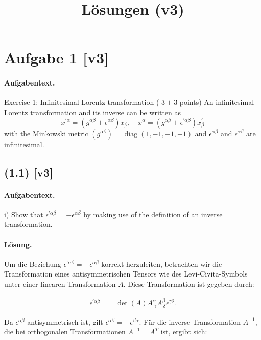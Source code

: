 \documentclass[11pt,a4paper]{article}
\title{Lösungen (v3)}
\date{}
\begin{document}
\maketitle

\section*{Aufgabe 1 [v3]}
\paragraph{Aufgabentext.}
Exercise 1: Infinitesimal Lorentz transformation ( $3+3$ points)
An infinitesimal Lorentz transformation and its inverse can be written as
$$
x^{\prime \alpha}=\left(g^{\alpha \beta}+\epsilon^{\alpha \beta}\right) x_\beta, \quad x^\alpha=\left(g^{\alpha \beta}+\epsilon^{\prime \alpha \beta}\right) x_\beta^{\prime}
$$
with the Minkowski metric $\left(g^{\alpha \beta}\right)=\operatorname{diag}(1,-1,-1,-1)$ and $\epsilon^{\alpha \beta}$ and $\epsilon^{\alpha \beta}$ are infinitesimal.

\subsection*{(1.1) [v3]}
\paragraph{Aufgabentext.}
i) Show that $\epsilon^{\prime \alpha \beta}=-\epsilon^{\alpha \beta}$ by making use of the definition of an inverse transformation.

\paragraph{Lösung.}
Um die Beziehung $\epsilon^{\prime \alpha \beta} = -\epsilon^{\alpha \beta}$ korrekt herzuleiten, betrachten wir die Transformation eines antisymmetrischen Tensors wie des Levi-Civita-Symbols unter einer linearen Transformation $A$. Diese Transformation ist gegeben durch:

\begin{align*}
\epsilon^{\prime \alpha \beta} &= \det(A) A^\alpha_{\ \gamma} A^\beta_{\ \delta} \epsilon^{\gamma \delta}.
\end{align*}

Da $\epsilon^{\alpha \beta}$ antisymmetrisch ist, gilt $\epsilon^{\alpha \beta} = -\epsilon^{\beta \alpha}$. Für die inverse Transformation $A^{-1}$, die bei orthogonalen Transformationen $A^{-1} = A^T$ ist, ergibt sich:
\end{document}
